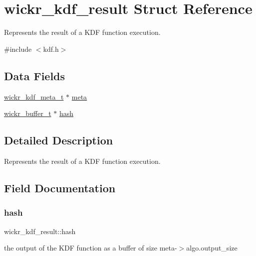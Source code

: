 \hypertarget{structwickr__kdf__result}{}\section{wickr\+\_\+kdf\+\_\+result Struct Reference}
\label{structwickr__kdf__result}


Represents the result of a K\+DF function execution.  




{\ttfamily \#include $<$kdf.\+h$>$}

\subsection*{Data Fields}
\begin{DoxyCompactItemize}
\item 
\hyperlink{structwickr__kdf__meta}{wickr\+\_\+kdf\+\_\+meta\+\_\+t} $\ast$ \hyperlink{structwickr__kdf__result_a8cf0778f7cb1a157ba3f44f34cbcd92e}{meta}
\item 
\hyperlink{structwickr__buffer}{wickr\+\_\+buffer\+\_\+t} $\ast$ \hyperlink{structwickr__kdf__result_a9b637f293f3243897f9e472b6ad06c21}{hash}
\end{DoxyCompactItemize}


\subsection{Detailed Description}
Represents the result of a K\+DF function execution. 

\subsection{Field Documentation}
\mbox{\label{structwickr__kdf__result_a9b637f293f3243897f9e472b6ad06c21}} 
\subsubsection{\texorpdfstring{hash}{hash}}
{\footnotesize\ttfamily wickr\+\_\+kdf\+\_\+result\+::hash}

the output of the K\+DF function as a buffer of size \textquotesingle{}meta-\/$>$algo.\+output\+\_\+size\textquotesingle{} \mbox{\label{structwickr__kdf__result_a8cf0778f7cb1a157ba3f44f34cbcd92e}} 
